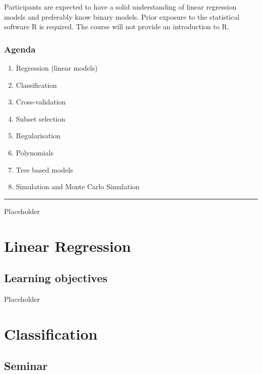 \documentclass[]{article}
\providecommand{\tightlist}{%
  \setlength{\itemsep}{0pt}\setlength{\parskip}{0pt}}
\begin{document}
Participants are expected to have a solid understanding of linear regression models and preferably know binary models. Prior exposure to the statistical software R is required. The course will not provide an introduction to R.

\hypertarget{agenda}{%
\subsubsection{Agenda}\label{agenda}}

\begin{enumerate}
\def\labelenumi{\arabic{enumi}.}
\tightlist
\item
  Regression (linear models)
\item
  Classification
\item
  Cross-validation
\item
  Subset selection
\item
  Regularisation
\item
  Polynomials
\item
  Tree based models
\item
  Simulation and Monte Carlo Simulation
\end{enumerate}

\begin{center}\rule{0.5\linewidth}{\linethickness}\end{center}

Placeholder

\hypertarget{linear-regression}{%
\section{Linear Regression}\label{linear-regression}}

\hypertarget{learning-objectives}{%
\subsection{Learning objectives}\label{learning-objectives}}

Placeholder

\hypertarget{classification}{%
\section{Classification}\label{classification}}

\hypertarget{seminar}{%
\subsection{Seminar}\label{seminar}}
\end{document}
